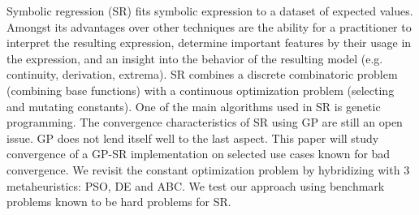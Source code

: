 Symbolic regression (SR) fits symbolic expression to a dataset of expected values. Amongst its advantages over other techniques are the ability for a practitioner to interpret the resulting expression, determine important features by their usage in the expression, and an insight into the behavior of the resulting model (e.g. continuity, derivation, extrema). SR combines a discrete combinatoric problem (combining base functions) with a continuous optimization problem (selecting and mutating constants). One of the main algorithms used in SR is genetic programming. The convergence characteristics of SR using GP are still an open issue. GP does not lend itself well to the last aspect. This paper will study convergence of a GP-SR implementation on selected use cases known for bad convergence. We revisit the constant optimization problem by hybridizing with 3 metaheuristics: PSO, DE and ABC. We test our approach using benchmark problems known to be hard problems for SR.